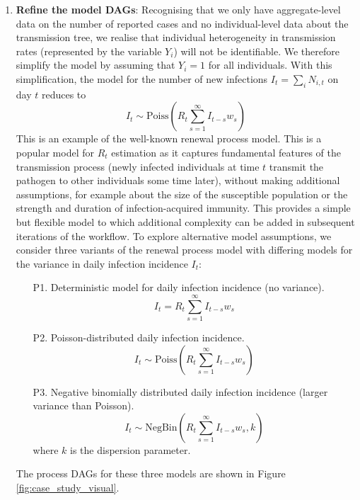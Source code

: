 \documentclass{article}
\begin{document}
\begin{enumerate}
\item \textbf{Refine the model DAGs}: Recognising that we only have aggregate-level data on the number of reported cases and no individual-level data about the transmission tree, we realise that individual heterogeneity in transmission rates (represented by the variable $Y_i$) will not be identifiable. We therefore simplify the model by assuming that $Y_i=1$ for all individuals. With this simplification, the model for the number of new infections $I_t=\sum_i N_{i,t}$ on day $t$ reduces to
    \begin{equation} 
        I_t \sim \mathrm{Poiss}\left( R_t \sum_{s=1}^\infty I_{t-s}w_s  \right)
    \end{equation}
    This is an example of the well-known renewal process model. This is a popular model for $R_t$ estimation as it captures fundamental features of the transmission process (newly infected individuals at time $t$ transmit the pathogen to other individuals some time later), without making additional assumptions, for example about the size of the susceptible population or the strength and duration of infection-acquired immunity. This provides a simple but flexible model to which additional complexity can be added in subsequent iterations of the workflow.
    To explore alternative model assumptions, we consider three variants of the renewal process model with differing models for the variance in daily infection incidence $I_t$:
    \begin{itemize}
    \item[P1.] Deterministic model for daily infection incidence (no variance).
    \begin{equation} \label{eq:infections_P1}
        I_t = R_t \sum_{s=1}^\infty I_{t-s}w_s 
    \end{equation}
    \item[P2.] Poisson-distributed daily infection incidence.
        \begin{equation} \label{eq:infections_P2}
        I_t \sim \mathrm{Poiss}\left( R_t \sum_{s=1}^\infty I_{t-s}w_s  \right)
    \end{equation}
    \item[P3.] Negative binomially distributed daily infection incidence (larger variance than Poisson). 
            \begin{equation} \label{eq:infections_P3}
        I_t \sim \mathrm{NegBin}\left( R_t \sum_{s=1}^\infty I_{t-s}w_s, k  \right)
    \end{equation}
    where $k$ is the dispersion parameter. 
    \end{itemize}
The process DAGs for these three models are shown in Figure \ref{fig:case_study_visual}.


\end{enumerate}
\end{document}
